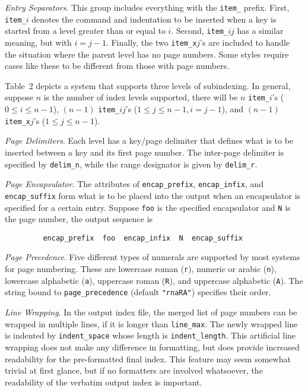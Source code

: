 {\it Entry Separators\/}.  This group includes everything with the
\verb|item_| prefix.  First, \verb|item_|$i$
denotes the command and indentation to be inserted when
a key is started from a level greater than or equal to $i$.
Second, \verb|item_|$ij$ has a similar meaning, but with
$i = j-1$.  Finally, the two \verb|item_x|$j$'s
are included to handle the situation where the parent level has no
page numbers.  Some styles require cases like these to be
different from those with page numbers.

Table~2 depicts a system that supports three levels of
subindexing.  In general, suppose $n$ is the number of index
levels supported, there will be $n$ \verb|item_|$i$'s 
($0 \leq i \leq n-1$), $(n-1)$ \verb|item_|$ij$'s
($1 \leq j \leq n-1,  i = j-1$), and
$(n-1)$ \verb|item_x|$j$'s ($1 \leq j \leq n-1$).

{\it Page Delimiters\/}.  Each level has a key/page delimiter
that defines what is to be inserted between a key and its first
page number.  The inter-page delimiter is specified by \verb|delim_n|,
while the range designator is given by \verb|delim_r|.

{\it Page Encapsulator\/}.  The attributes of
\verb|encap_prefix|, \verb|encap_infix|, and \verb|encap_suffix|
form what is to be placed into the output
 when an encapsulator is specified
for a certain entry.  Suppose \verb|foo| is the specified encapsulator
and \verb|N| is the page number, the output sequence is
\begin{verbatim}
	     encap_prefix  foo  encap_infix  N  encap_suffix
\end{verbatim}

{\it Page Precedence\/}.  Five different types of numerals are
supported by most systems for page numbering.  These are
lowercase roman (\verb|r|), numeric or arabic (\verb|n|),
lowercase alphabetic (\verb|a|), uppercase roman (\verb|R|),
and uppercase alphabetic (\verb|A|).  The string bound to
\verb|page_precedence| (default \verb|"rnaRA"|)
specifies their order.

{\it Line Wrapping\/}.  In the output index file, 
the merged list of page numbers	can be wrapped in multiple lines,
if it is longer than \verb|line_max|.  The newly wrapped
line is indented by \verb|indent_space| whose length is
\verb|indent_length|.  This artificial line wrapping does not
make any difference in formatting, but does provide increased
readability for the pre-formatted final index.
This feature may seem somewhat trivial at first glance, but if no
formatters are involved whatsoever, the readability of the
verbatim output index is important.


